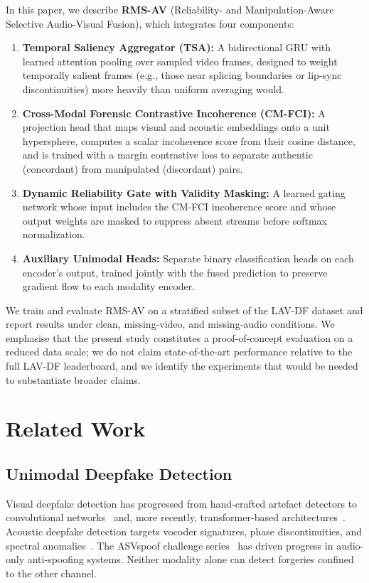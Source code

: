 \documentclass[conference]{IEEEtran}
\begin{document}
In this paper, we describe \textbf{RMS-AV} (Reliability- and Manipulation-Aware Selective Audio-Visual Fusion), which integrates four components:
\begin{enumerate}
    \item \textbf{Temporal Saliency Aggregator (TSA):} A bidirectional GRU with learned attention pooling over sampled video frames, designed to weight temporally salient frames (e.g., those near splicing boundaries or lip-sync discontinuities) more heavily than uniform averaging would.
    \item \textbf{Cross-Modal Forensic Contrastive Incoherence (CM-FCI):} A projection head that maps visual and acoustic embeddings onto a unit hypersphere, computes a scalar incoherence score from their cosine distance, and is trained with a margin contrastive loss to separate authentic (concordant) from manipulated (discordant) pairs.
    \item \textbf{Dynamic Reliability Gate with Validity Masking:} A learned gating network whose input includes the CM-FCI incoherence score and whose output weights are masked to suppress absent streams before softmax normalization.
    \item \textbf{Auxiliary Unimodal Heads:} Separate binary classification heads on each encoder's output, trained jointly with the fused prediction to preserve gradient flow to each modality encoder.
\end{enumerate}

We train and evaluate RMS-AV on a stratified subset of the LAV-DF dataset and report results under clean, missing-video, and missing-audio conditions. We emphasise that the present study constitutes a proof-of-concept evaluation on a reduced data scale; we do not claim state-of-the-art performance relative to the full LAV-DF leaderboard, and we identify the experiments that would be needed to substantiate broader claims.

\section{Related Work}

\subsection{Unimodal Deepfake Detection}
Visual deepfake detection has progressed from hand-crafted artefact detectors to convolutional networks~\cite{rossler2019faceforensics} and, more recently, transformer-based architectures~\cite{coccomini2022combining}. Acoustic deepfake detection targets vocoder signatures, phase discontinuities, and spectral anomalies~\cite{korshunov2018deepfakes}. The ASVspoof challenge series~\cite{yamagishi2021asvspoof} has driven progress in audio-only anti-spoofing systems. Neither modality alone can detect forgeries confined to the other channel.
\end{document}
